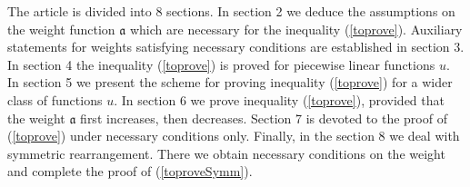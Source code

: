 The article is divided into 8 sections.
In section 2 we deduce the assumptions on the weight function $\mathfrak a$ which are necessary for the 
inequality (\ref{toprove}).
Auxiliary statements for weights satisfying necessary conditions are established in section 3.
In section 4 the inequality (\ref{toprove}) is proved for piecewise linear functions $u$.
In section 5 we present the scheme for proving inequality (\ref{toprove}) for a wider class of 
functions $u$.
In section 6 we prove inequality (\ref{toprove}), provided that the weight $\mathfrak a$ first increases, 
then decreases.
Section 7 is devoted to the proof of (\ref{toprove}) under necessary conditions only.
Finally, in the section 8 we deal with symmetric rearrangement.
There we obtain necessary conditions on the weight and complete the proof of (\ref{toproveSymm}).
